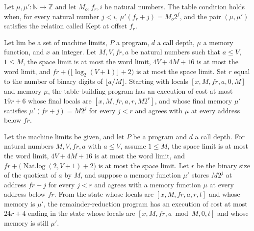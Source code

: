 \begin{definition}
\label{Light.Emod.Table}
\leanok
{}
Let $\mu,\mu':\mathbb N\to\mathbb Z$ and let $M_o,f_r,i$ be natural numbers. The table
condition holds when, for every natural number $j<i$, $\mu'(f_r+j)=M_o2^j$, and the pair
$(\mu,\mu')$ satisfies the relation called $\mathrm{Kept}$ at offset $f_r$.
\end{definition}

\begin{theorem}
\label{Light.Emod.table_ends}
\leanok
{}
Let $\mathrm{lim}$ be a set of machine limits, $P$ a program, $d$ a call depth, $\mu$ a
memory function, and $x$ an integer. Let $M,V,fr,a$ be natural numbers such that $a\le
V$, $1\le M$, the space limit is at most the word limit, $4V+4M+16$ is at most the word
limit, and $fr+\bigl(\lfloor\log_2(V+1)\rfloor+2\bigr)$ is at most the space limit. Set
$r$ equal to the number of binary digits of $\lfloor a/M\rfloor$. Starting with locals
$[x,M,fr,a,0,M]$ and memory $\mu$, the table-building program has an execution of cost
at most $19r+6$ whose final locals are $[x,M,fr,a,r,M2^r]$, and whose final memory
$\mu'$ satisfies $\mu'(fr+j)=M2^j$ for every $j<r$ and agrees with $\mu$ at every
address below $fr$.
\end{theorem}

\begin{theorem}
\label{Light.Emod.reduce_ends}
\leanok
{}
Let the machine limits be given, and let $P$ be a program and $d$ a call depth. For
natural numbers $M,V,fr,a$ with $a\le V$, assume $1\le M$, the space limit is at most
the word limit, $4V+4M+16$ is at most the word limit, and
$fr+\bigl(\operatorname{Nat.log}(2,V+1)+2\bigr)$ is at most the space limit. Let $r$ be
the binary size of the quotient of $a$ by $M$, and suppose a memory function $\mu'$
stores $M2^j$ at address $fr+j$ for every $j<r$ and agrees with a memory function $\mu$
at every address below $fr$. From the state whose locals are $[x,M,fr,a,r,t]$ and whose
memory is $\mu'$, the remainder-reduction program has an execution of cost at most
$24r+4$ ending in the state whose locals are $[x,M,fr,a\bmod M,0,t]$ and whose memory is
still $\mu'$.
\end{theorem}

